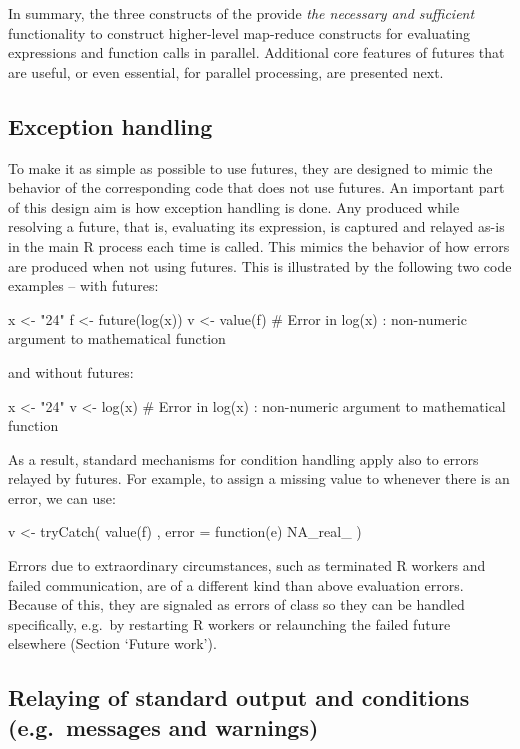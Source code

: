 In summary, the three constructs of the  provide
\emph{the necessary and sufficient} functionality to construct
higher-level map-reduce constructs for evaluating expressions and
function calls in parallel.  Additional core features of futures that
are useful, or even essential, for parallel processing, are presented
next.


\subsection{Exception handling}
\label{error-handling}

To make it as simple as possible to use futures, they are designed to
mimic the behavior of the corresponding code that does not use
futures.  An important part of this design aim is how exception
handling is done.  Any  produced while resolving a future,
that is, evaluating its expression, is captured and relayed as-is in
the main R process each time  is called.  This mimics
the behavior of how errors are produced when not using futures.  This
is illustrated by the following two code examples -- with futures:
\begin{example}
x <- "24"
f <- future(log(x))
v <- value(f)
# Error in log(x) : non-numeric argument to mathematical function
\end{example}
and without futures:
\begin{example}
x <- "24"
v <- log(x)
# Error in log(x) : non-numeric argument to mathematical function
\end{example}
As a result, standard mechanisms for condition handling apply also to
errors relayed by futures.  For example, to assign a missing value
to  whenever there is an error, we can use:
\begin{example}
v <- tryCatch({
  value(f)
}, error = function(e) {
  NA_real_
})
\end{example}

Errors due to extraordinary circumstances, such as terminated R
workers and failed communication, are of a different kind than above
evaluation errors.  Because of this, they are signaled as errors of
class  so they can be handled specifically, e.g.\ by
restarting R workers or relaunching the failed future elsewhere
(Section `Future work').


\subsection{Relaying of standard output and conditions (e.g.\ messages and warnings)}
\label{relaying-of-standard-output-and-conditions-e.g.messages-and-warnings}

